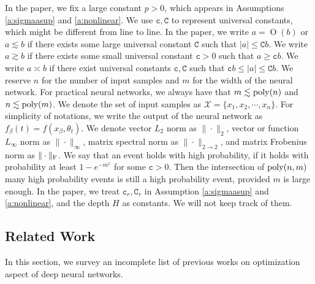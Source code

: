 \documentclass{article}
\numberwithin{equation}{section}
\newcommand\cX{{\mathcal X}}
\newcommand{\fc}{{\mathtt c}}
\newcommand{\fC}{{\mathtt C}}
\DeclareMathOperator{\OO}{O}
\renewcommand{\leq}{\leqslant}
\renewcommand{\geq}{\geqslant}
\newcommand{\1}{\mathds{1}}
\theoremstyle{plain} %
\newcommand{\poly}{{\rm poly}}
\begin{document}
In the paper, we fix a large constant $p>0$, which appears in Assumptions \eqref{a:sigmaasup} and \eqref{a:nonlinear}. 
We use $\fc, \fC$ to represent universal constants, which might be different from line to line. In the paper, we write $a=\OO(b)$ or $a\lesssim b$ if there exists some large universal constant $\fC$ such that $|a|\leq \fC b$. We write $a\gtrsim b$ if there exists some small universal constant $\fc>0$ such that $a\geq \fc b$. We write $a\asymp b$ if there exist universal constants $\fc,\fC$ such that $\fc b\leq |a|\leq \fC b$. We reserve $n$ for the number of input samples and $m$ for the width of the neural network. For practical neural networks, we always have that $m\lesssim \poly(n)$ and $n\lesssim \poly(m)$. We denote the set of input samples as $\cX=\{x_1, x_2, \cdots, x_n\}$. For simplicity of notations, we write the output of the neural network as $f_\beta(t)=f(x_\beta,\theta_t)$.  We denote vector $L_2$ norm as $\|\cdot\|_2$, vector or function $L_\infty$ norm as $\|\cdot\|_\infty$, matrix spectral norm as $\|\cdot\|_{2\rightarrow 2}$, and matrix Frobenius norm as $\|\cdot\|_{\rm F}$. We say that an event holds with high probability, if it holds with probability at least $1-e^{-m^{\fc}}$ for some $\fc>0$. Then the intersection of $\poly(n,m)$ many high probability events is still a high probability event, provided $m$ is large enough. In the paper, we treat 
$\fc_r, \fC_r$ in Assumption \ref{a:sigmaasup} and \ref{a:nonlinear}, and the depth $H$ as constants. We will not keep track of them.



\subsection{Related Work}
In this section, we survey an incomplete list of previous works on optimization aspect of deep neural networks.
\end{document}
